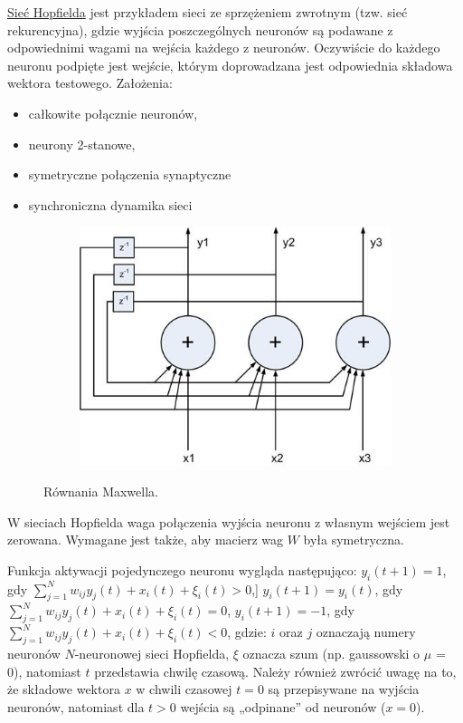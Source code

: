 \underline{Sieć Hopfielda} jest przykładem sieci ze sprzężeniem zwrotnym (tzw. sieć rekurencyjna), gdzie wyjścia poszczególnych neuronów są podawane z odpowiednimi wagami na wejścia każdego z neuronów. Oczywiście do każdego neuronu podpięte jest wejście, którym doprowadzana jest odpowiednia składowa wektora testowego. Założenia:
\begin{itemize}
	\item całkowite połącznie neuronów,
	\item neurony 2-stanowe,
	\item symetryczne połączenia synaptyczne
	\item synchroniczna dynamika sieci
\end{itemize}

\begin{figure} [H]
	\centering
	\begin{subfigure}{.69\textwidth}
		\centering
		\includegraphics[width=1.0\linewidth]{EDMIIssues/Figures/hopfield.jpg}
	\end{subfigure}
	\caption{Równania Maxwella.}
	\label{hopfield}
\end{figure}

W sieciach Hopfielda waga połączenia wyjścia neuronu z własnym wejściem jest zerowana. Wymagane jest także, aby macierz wag $ W $ była symetryczna.

Funkcja aktywacji pojedynczego neuronu wygląda następująco:\newline
$ y_i(t+1) = 1 $, gdy $ \sum_{j=1}^N w_{ij}y_j(t) + x_i(t) + \xi_i(t) > 0 $,]\newline
$ y_i(t+1) = y_i(t) $, gdy $ \sum_{j=1}^N w_{ij}y_j(t) + x_i(t) + \xi_i(t) = 0 $,\newline
$ y_i(t+1) = -1 $, gdy $ \sum_{j=1}^N w_{ij}y_j(t) + x_i(t) + \xi_i(t) < 0 $, gdzie:\newline
$ i $ oraz $ j $ oznaczają numery neuronów $ N $-neuronowej sieci Hopfielda, $ \xi $ oznacza szum (np. gaussowski o $ \mu $ = 0),  natomiast $ t $ przedstawia chwilę czasową. Należy również zwrócić uwagę na to, że składowe wektora $ x $ w chwili czasowej $ t=0 $ są przepisywane na wyjścia neuronów, natomiast dla $ t>0 $ wejścia są „odpinane” od neuronów ($ x=0 $).


